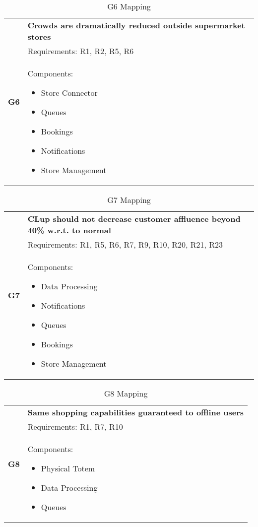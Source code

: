 \begin{table}[H]
	\begin{tabular}{|c|p{14cm}|}
		\hline
		\multirow{3}{*}[-4em]{\textbf{G6}} & \cellcolor{Dandelion} \textbf{Crowds are dramatically reduced outside supermarket stores}\\ \cline{2-2}
		& \cellcolor{GreenYellow} Requirements: R1, R2, R5, R6 \\ \cline{2-2}
		& \cellcolor{SkyBlue} Components: \begin{itemize}
			\item Store Connector
			\item Queues
			\item Bookings
			\item Notifications
			\item Store Management
		\end{itemize}\\ \hline
	\end{tabular}
	\label{tab:G6Mapping}
	\caption{G6 Mapping}
\end{table}

\begin{table}[H]
	\begin{tabular}{|c|p{14cm}|}
		\hline
		\multirow{3}{*}[-5em]{\textbf{G7}} & \cellcolor{Dandelion} \textbf{CLup should not decrease customer affluence beyond 40\% w.r.t. to
normal}\\ \cline{2-2}
		& \cellcolor{GreenYellow} Requirements: R1, R5, R6, R7, R9, R10, R20, R21, R23\\ \cline{2-2}
		& \cellcolor{SkyBlue} Components: \begin{itemize}
			\item Data Processing
			\item Notifications
			\item Queues
			\item Bookings
			\item Store Management
		\end{itemize}\\ \hline
	\end{tabular}
	\label{tab:G7Mapping}
	\caption{G7 Mapping}
\end{table}

\begin{table}[H]
	\begin{tabular}{|c|p{14cm}|}
		\hline
		\multirow{3}{*}[-3em]{\textbf{G8}} & \cellcolor{Dandelion} \textbf{Same shopping capabilities guaranteed to offline users}\\ \cline{2-2}
		& \cellcolor{GreenYellow} Requirements: R1, R7, R10\\ \cline{2-2}
		& \cellcolor{SkyBlue} Components: \begin{itemize}
			\item Physical Totem
			\item Data Processing
			\item Queues
		\end{itemize}\\ \hline
	\end{tabular}
	\label{tab:G8Mapping}
	\caption{G8 Mapping}
\end{table}

